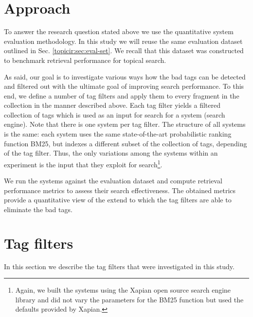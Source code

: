 \section{Approach}\label{sec:filter:approach}
To answer the research question stated above we use the quantitative system evaluation methodology. In this study we will reuse the same evaluation dataset outlined in Sec. \ref{topicir:sec:eval-set}. We recall that this dataset was constructed to benchmark retrieval performance for topical search.

As said, our goal is to investigate various ways how the bad tags can be detected and filtered out with the ultimate goal of improving search performance. To this end, we define a number of tag filters and apply them to every fragment in the collection in the manner described above. Each tag filter yields a filtered collection of tags which is used as an input for search for a system (search engine). Note that there is one system per tag filter. The structure of all systems is the same: each system uses the same state-of-the-art probabilistic ranking function BM25, but indexes a different subset of the collection of tags, depending of the tag filter. Thus, the only variations among the systems within an experiment is the input that they exploit for search\footnote{Again, we built the systems using the Xapian open source search engine library and did not vary the parameters for the BM25 function but used the defaults provided by Xapian.}.

We run the systems against the evaluation dataset and compute retrieval performance metrics to assess their search effectiveness. The obtained metrics provide a quantitative view of the extend to which the tag filters are able to eliminate the bad tags. %


\section{Tag filters}\label{filter:sec:filters}
In this section we describe the tag filters that were investigated in this study.

